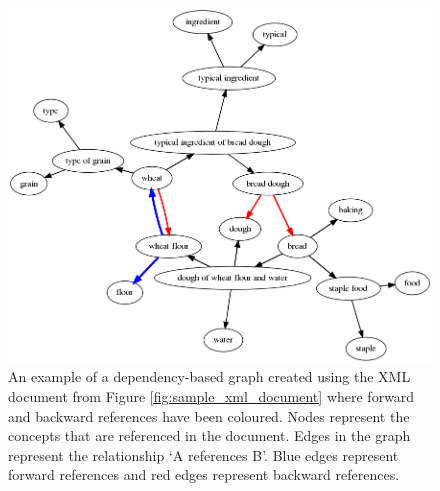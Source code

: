 \documentclass[12pt]{article}
\begin{document}

\begin{figure}
    \centering
    \includegraphics[width=\linewidth]{reports/technical_report/latex/figures/bread_graph-sections_only.png}
    \caption{An example of a dependency-based graph created using the XML document from Figure \ref{fig:sample_xml_document} where forward and backward references have been coloured. Nodes represent the concepts that are referenced in the document. Edges in the graph represent the relationship `A references B'. Blue edges represent forward references and red edges represent backward references.}
    \label{fig:graph_example-coloured_edges}
\end{figure}
\end{document}
